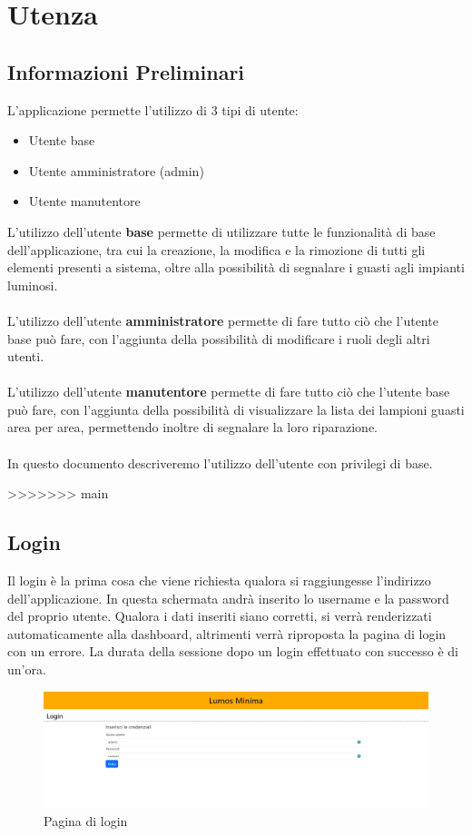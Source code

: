 \documentclass[a4paper, 12pt]{article}
\begin{document}
\newpage
\section{Utenza}
\subsection{Informazioni Preliminari}
L'applicazione permette l'utilizzo di 3 tipi di utente:
\begin{itemize}
    \item Utente base
    \item Utente amministratore (admin)
    \item Utente manutentore
\end{itemize}
L'utilizzo dell'utente \textbf{base} permette di utilizzare tutte le funzionalità di base dell'applicazione, tra cui la creazione, la modifica e la rimozione di tutti gli elementi presenti a sistema, oltre alla possibilità di segnalare i guasti agli impianti luminosi.\\ \\
L'utilizzo dell'utente \textbf{amministratore} permette di fare tutto ciò che l'utente base può fare, con l'aggiunta della possibilità di modificare i ruoli degli altri utenti.\\ \\
L'utilizzo dell'utente \textbf{manutentore} permette di fare tutto ciò che l'utente base può fare, con l'aggiunta della possibilità di visualizzare la lista dei lampioni guasti area per area, permettendo inoltre di segnalare la loro riparazione.\\\\
In questo documento descriveremo l'utilizzo dell'utente con privilegi di base.

>>>>>>> main
\subsection{Login}
Il login è la prima cosa che viene richiesta qualora si raggiungesse l'indirizzo dell'applicazione. In questa schermata andrà inserito lo username e la password del proprio utente. Qualora i dati inseriti siano corretti, si verrà renderizzati automaticamente alla dashboard, altrimenti verrà riproposta la pagina di login con un errore. La durata della sessione dopo un login effettuato con successo è di un'ora.
\begin{figure}[H]
    \centering
    \includegraphics[width=\textwidth]{login}
    \caption{Pagina di login}
\end{figure}
\end{document}
